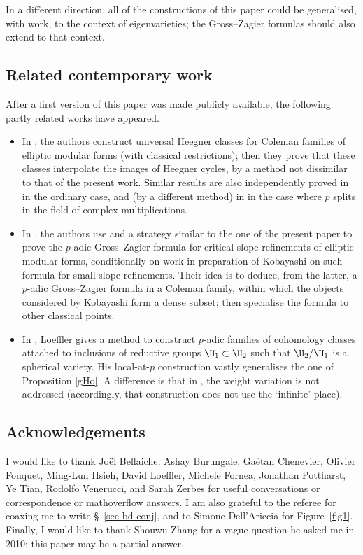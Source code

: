   In a different direction, all of the constructions of this paper could be generalised, with work, to the context of eigenvarieties;   the  Gross--Zagier formulas should also extend to that context.

\subsection{Related contemporary work} After a first version of this paper was made publicly available, the following partly related works have appeared.
\begin{itemize}
\item In  \cite{JLZ}, the authors construct universal Heegner classes for Coleman families of elliptic modular forms (with classical restrictions); then they prove that these classes interpolate the images of Heegner cycles, by a method not dissimilar to that of the present work. Similar results are also  independently proved in \cite{ota} in the ordinary case, and (by a  different method) in   \cite{BL} in the case where $p$ splits in the field of complex multiplications.
\item In \cite{BPS},  the authors
use \cite{JLZ,BL} and a strategy similar to the one of the present paper to prove the $p$-adic Gross--Zagier formula for critical-slope refinements of elliptic modular forms, conditionally on  work in preparation  of Kobayashi on such formula for small-slope refinements. Their idea is to deduce, from the latter,  a $p$-adic Gross--Zagier formula in a Coleman family, within which the objects considered by Kobayashi form a dense subset; then specialise the formula to other  classical points.
\item In \cite{loeffler}, Loeffler gives a method to construct  $p$-adic  families of cohomology classes attached to   inclusions of reductive groups $\H_{1}\subset \H_{2}$ such that
$\H_{2}/\H_{1}$ is  a spherical variety. His local-at-$p$ construction vastly generalises the one of Proposition \ref{gHo}. A difference is that in \cite{loeffler}, the weight variation is not addressed (accordingly, that construction does not use the `infinite' place).
\end{itemize}

 \FloatBarrier

\subsection{Acknowledgements} I would like to thank  Jo\"el Bellaiche, Ashay Burungale, Ga\"etan Chenevier,  Olivier Fouquet, Ming-Lun Hsieh, David Loeffler, Michele Fornea, Jonathan Pottharst,  Ye Tian,  Rodolfo Venerucci, and Sarah Zerbes for useful conversations or correspondence or mathoverflow answers. I am also grateful to the referee for coaxing me to write \S~\ref{sec bd conj}, and to Simone Dell'Ariccia for Figure~\ref{fig1}.
 Finally,  I would  like to thank Shouwu Zhang for  a  vague question  he asked me in 2010; this paper may be a partial answer.


